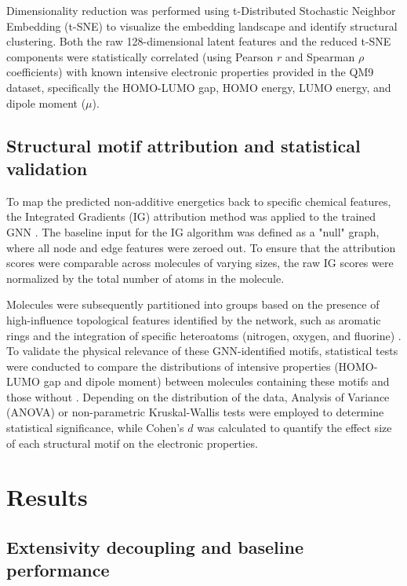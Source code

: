 \documentclass[]{article}
\begin{document}
Dimensionality reduction was performed using t-Distributed Stochastic Neighbor Embedding (t-SNE) to visualize the embedding landscape and identify structural clustering. Both the raw 128-dimensional latent features and the reduced t-SNE components were statistically correlated (using Pearson $r$ and Spearman $\rho$ coefficients) with known intensive electronic properties provided in the QM9 dataset, specifically the HOMO-LUMO gap, HOMO energy, LUMO energy, and dipole moment ($\mu$).

\subsection{Structural motif attribution and statistical validation}
To map the predicted non-additive energetics back to specific chemical features, the Integrated Gradients (IG) attribution method was applied to the trained GNN \citep{ji2026molledgeradditivegraphneural}. The baseline input for the IG algorithm was defined as a "null" graph, where all node and edge features were zeroed out. To ensure that the attribution scores were comparable across molecules of varying sizes, the raw IG scores were normalized by the total number of atoms in the molecule.

Molecules were subsequently partitioned into groups based on the presence of high-influence topological features identified by the network, such as aromatic rings and the integration of specific heteroatoms (nitrogen, oxygen, and fluorine) \citep{esders2024analyzingatomicinteractionsmolecules,polat2025understandingcapabilitiesmoleculargraph}. To validate the physical relevance of these GNN-identified motifs, statistical tests were conducted to compare the distributions of intensive properties (HOMO-LUMO gap and dipole moment) between molecules containing these motifs and those without \citep{gilmer2017neuralmessagepassingquantum,choi2022scalabletraininggraphconvolutional}. Depending on the distribution of the data, Analysis of Variance (ANOVA) or non-parametric Kruskal-Wallis tests were employed to determine statistical significance, while Cohen's $d$ was calculated to quantify the effect size of each structural motif on the electronic properties.

\section{Results}
\label{sec:results}
\subsection{Extensivity decoupling and baseline performance}
\end{document}
